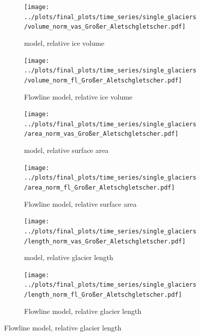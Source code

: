 \begin{figure}[p]
  \centering

  \begin{subfigure}[b]{0.476\textwidth}
    \caption{\Vas{} model, relative ice volume}
    \label{fig:Grosser_Aletschgletscher:volume_vas}
    \centering
    \texttt{[image: ../plots/final\_plots/time\_series/single\_glaciers/volume\_norm\_vas\_Großer\_Aletschgletscher.pdf]}
  \end{subfigure}
  \hfill
  \begin{subfigure}[b]{0.476\textwidth}
    \caption{Flowline model, relative ice volume}
    \label{fig:Grosser_Aletschgletscher:volume_fl}
    \centering
    \texttt{[image: ../plots/final\_plots/time\_series/single\_glaciers/volume\_norm\_fl\_Großer\_Aletschgletscher.pdf]}
  \end{subfigure}

  \begin{subfigure}[b]{0.476\textwidth}
    \caption{\Vas{} model, relative surface area}
    \label{fig:Grosser_Aletschgletscher:area_vas}
    \centering
    \texttt{[image: ../plots/final\_plots/time\_series/single\_glaciers/area\_norm\_vas\_Großer\_Aletschgletscher.pdf]}
  \end{subfigure}
  \hfill
  \begin{subfigure}[b]{0.476\textwidth}
    \caption{Flowline model, relative surface area}
    \label{fig:Grosser_Aletschgletscher:area_fl}
    \centering
    \texttt{[image: ../plots/final\_plots/time\_series/single\_glaciers/area\_norm\_fl\_Großer\_Aletschgletscher.pdf]}
  \end{subfigure}

  \begin{subfigure}[b]{0.476\textwidth}
    \caption{\Vas{} model, relative glacier length}
    \label{fig:Grosser_Aletschgletscher:length_vas}
    \centering
    \texttt{[image: ../plots/final\_plots/time\_series/single\_glaciers/length\_norm\_vas\_Großer\_Aletschgletscher.pdf]}
  \end{subfigure}
  \hfill
  \begin{subfigure}[b]{0.476\textwidth}
    \caption{Flowline model, relative glacier length}
    \label{fig:Grosser_Aletschgletscher:length_fl}
    \centering
    \texttt{[image: ../plots/final\_plots/time\_series/single\_glaciers/length\_norm\_fl\_Großer\_Aletschgletscher.pdf]}
  \end{subfigure}
  

\end{figure}
